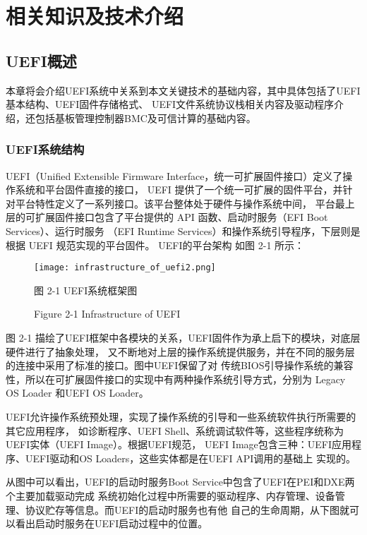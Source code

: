 %
%
\chapter{相关知识及技术介绍}

%
%
\section{UEFI概述}
本章将会介绍UEFI系统中关系到本文关键技术的基础内容，其中具体包括了UEFI基本结构、UEFI固件存储格式、
UEFI文件系统协议栈相关内容及驱动程序介绍，还包括基板管理控制器BMC及可信计算的基础内容。

\subsection{UEFI系统结构}
UEFI（Unified Extensible Firmware Interface，统一可扩展固件接口）定义了操作系统和平台固件直接的接口，
UEFI 提供了一个统一可扩展的固件平台，并针对平台特性定义了一系列接口。该平台整体处于硬件与操作系统中间，
平台最上层的可扩展固件接口包含了平台提供的 API 函数、启动时服务（EFI  Boot  Services）、运行时服务
（EFI  Runtime Services）和操作系统引导程序\cite{english21}，下层则是根据 UEFI 规范实现的平台固件。
UEFI的平台架构
如图 2-1 所示：

\begin{figure}[htb]
    \vspace{0cm}
    \setlength{\abovecaptionskip}{0.3cm}
	\centering
    \texttt{[image: infrastructure\_of\_uefi2.png]}
    \caption*{图 2-1 UEFI系统框架图}
    \setlength{\belowcaptionskip}{-0.7cm}
    \caption*{Figure 2-1 Infrastructure of UEFI}
\end{figure}

\par 图 2-1 描绘了UEFI框架中各模块的关系，UEFI固件作为承上启下的模块，对底层硬件进行了抽象处理，
又不断地对上层的操作系统提供服务，并在不同的服务层的连接中采用了标准的接口。图中UEFI保留了对
传统BIOS引导操作系统的兼容性，所以在可扩展固件接口的实现中有两种操作系统引导方式，分别为
Legacy OS Loader 和UEFI OS Loader。 
\par UEFI允许操作系统预处理，实现了操作系统的引导和一些系统软件执行所需要的其它应用程序，
如诊断程序、UEFI Shell、系统调试软件等，这些程序统称为UEFI实体（UEFI Image）。根据UEFI规范，
UEFI Image包含三种：UEFI应用程序、UEFI驱动和OS Loaders，这些实体都是在UEFI API调用的基础上
实现的。
\par 从图中可以看出，UEFI的启动时服务Boot Service中包含了UEFI在PEI和DXE两个主要加载驱动完成
系统初始化过程中所需要的驱动程序、内存管理、设备管理、协议贮存等信息。而UEFI的启动时服务也有他
自己的生命周期，从下图就可以看出启动时服务在UEFI启动过程中的位置。

